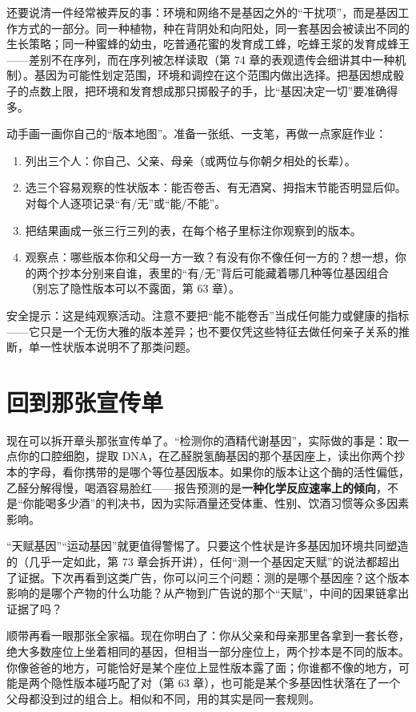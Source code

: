 还要说清一件经常被弄反的事：环境和网络不是基因之外的“干扰项”，而是基因工作方式的一部分。同一种植物，种在背阴处和向阳处，同一套基因会被读出不同的生长策略；同一种蜜蜂的幼虫，吃普通花蜜的发育成工蜂，吃蜂王浆的发育成蜂王——差别不在序列，而在序列被怎样读取（第 74 章的表观遗传会细讲其中一种机制）。基因为可能性划定范围，环境和调控在这个范围内做出选择。把基因想成骰子的点数上限，把环境和发育想成那只掷骰子的手，比“基因决定一切”要准确得多。

\begin{shiyan}
动手画一画你自己的“版本地图”。准备一张纸、一支笔，再做一点家庭作业：
\begin{enumerate}[itemsep=1pt]
\item 列出三个人：你自己、父亲、母亲（或两位与你朝夕相处的长辈）。
\item 选三个容易观察的性状版本：能否卷舌、有无酒窝、拇指末节能否明显后仰。对每个人逐项记录“有/无”或“能/不能”。
\item 把结果画成一张三行三列的表，在每个格子里标注你观察到的版本。
\item 观察点：哪些版本你和父母一方一致？有没有你不像任何一方的？想一想，你的两个抄本分别来自谁，表里的“有/无”背后可能藏着哪几种等位基因组合（别忘了隐性版本可以不露面，第 63 章）。
\end{enumerate}
安全提示：这是纯观察活动。注意不要把“能不能卷舌”当成任何能力或健康的指标——它只是一个无伤大雅的版本差异；也不要仅凭这些特征去做任何亲子关系的推断，单一性状版本说明不了那类问题。
\end{shiyan}

\section{回到那张宣传单}

现在可以拆开章头那张宣传单了。“检测你的酒精代谢基因”，实际做的事是：取一点你的口腔细胞，提取 DNA，在乙醛脱氢酶基因的那个基因座上，读出你两个抄本的字母，看你携带的是哪个等位基因版本。如果你的版本让这个酶的活性偏低，乙醛分解得慢，喝酒容易脸红——报告预测的是\textbf{一种化学反应速率上的倾向}，不是“你能喝多少酒”的判决书，因为实际酒量还受体重、性别、饮酒习惯等众多因素影响。

“天赋基因”“运动基因”就更值得警惕了。只要这个性状是许多基因加环境共同塑造的（几乎一定如此，第 73 章会拆开讲），任何“测一个基因定天赋”的说法都超出了证据。下次再看到这类广告，你可以问三个问题：测的是哪个基因座？这个版本影响的是哪个产物的什么功能？从产物到广告说的那个“天赋”，中间的因果链拿出证据了吗？

顺带再看一眼那张全家福。现在你明白了：你从父亲和母亲那里各拿到一套长卷，绝大多数座位上坐着相同的基因，但相当一部分座位上，两个抄本是不同的版本。你像爸爸的地方，可能恰好是某个座位上显性版本露了面；你谁都不像的地方，可能是两个隐性版本碰巧配了对（第 63 章），也可能是某个多基因性状落在了一个父母都没到过的组合上。相似和不同，用的其实是同一套规则。

